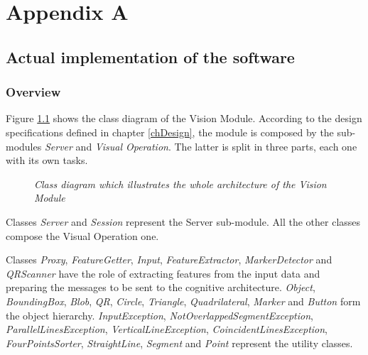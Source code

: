 \appendix
\chapter{Appendix A}\label{appA}
	
	\section{Actual implementation of the software}
	
		\subsection{Overview}\label{impl_arch}
		Figure \ref{fig:implementation_names} shows the class diagram of the Vision Module. 
		According to the design specifications defined in chapter \ref{chDesign}, the module is composed by the sub-modules \emph{Server} and \emph{Visual Operation}. 
		The latter is split in three parts, each one with its own tasks.

		\begin{figure}[h]
		  \begin{center} 
		  \end{center} 
		  \caption{\textit{Class diagram which illustrates the whole architecture of the Vision Module}}  
		  \label{fig:implementation_names}
	 	\end{figure}
 
		Classes \emph{Server} and \emph{Session} represent the Server sub-module.
		All the other classes compose the Visual Operation one.


		Classes \emph{Proxy}, \emph{FeatureGetter}, \emph{Input}, \emph{FeatureExtractor}, \emph{MarkerDetector} and \emph{QRScanner} have the role of extracting features from the input data and preparing the messages to be sent to the cognitive architecture.
		\emph{Object}, \emph{BoundingBox}, \emph{Blob}, \emph{QR}, \emph{Circle}, \emph{Triangle}, \emph{Quadrilateral}, \emph{Marker} and \emph{Button} form the object hierarchy.
		\emph{InputException}, \emph{NotOverlappedSegmentException}, \emph{ParallelLinesException}, \emph{VerticalLineException}, \emph{CoincidentLinesException}, \emph{FourPointsSorter}, \emph{StraightLine}, \emph{Segment} and \emph{Point} represent the utility classes.
	
